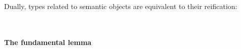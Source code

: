 \documentclass[sigplan,screen]{acmart}
\begin{document}
\begin{AgdaAlign}
\begin{code}
\AgdaSpace{}%
\AgdaSymbol{\}}\AgdaSpace{}%
\AgdaSymbol{\{}\AgdaSpace{}%
\AgdaSymbol{:}%
\>[37]\AgdaSpace{}%
\AgdaSpace{}%
\AgdaSymbol{\}}\AgdaSpace{}%
\<%
\\
\>[3660I][@{}l@{\AgdaIndent{0}}]%
\>[15]\AgdaSpace{}%
\AgdaSpace{}%
\AgdaSpace{}%
\AgdaSpace{}%
\AgdaSpace{}%
\AgdaSpace{}%
\AgdaSpace{}%
\AgdaSpace{}%
\AgdaSpace{}%
\<%
\end{code}
\begin{code}[hide]%
%
\>[2]\AgdaSpace{}%
\AgdaSymbol{=}\AgdaSpace{}%
\<%
\end{code}
\end{AgdaAlign}

\Ni Dually, types related to semantic objects are equivalent to their reification:

\begin{AgdaAlign}
\begin{code}%
%
\>[2]\AgdaSpace{}%
\AgdaSymbol{:}%
\>[3683I]\AgdaSymbol{\{}\AgdaSpace{}%
\AgdaSymbol{:}\AgdaSpace{}%
\AgdaSpace{}%
\AgdaSpace{}%
\AgdaSymbol{\}}\AgdaSpace{}%
\AgdaSymbol{\{}\AgdaSpace{}%
\AgdaSymbol{:}%
\>[35]\AgdaSpace{}%
\AgdaSpace{}%
\AgdaSymbol{\}}\AgdaSpace{}%
\<%
\\
\>[.][@{}l@{}]\<[3683I]%
\>[14]\AgdaSpace{}%
\AgdaSpace{}%
\AgdaSpace{}%
\AgdaSpace{}%
\AgdaSpace{}%
\AgdaSpace{}%
\AgdaSpace{}%
\AgdaSpace{}%
\AgdaSymbol{(}\AgdaSpace{}%
\AgdaSymbol{)}\<%
\end{code}
\begin{code}[hide]%
%
\>[2]\AgdaSpace{}%
\AgdaSymbol{=}\AgdaSpace{}%
\<%
\end{code}
\end{AgdaAlign}

\paragraph{The fundamental lemma}
\end{document}
